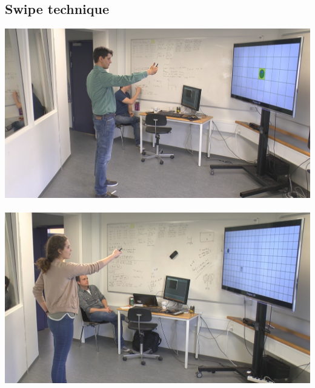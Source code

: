 \subsection*{Swipe technique}
\includegraphics[width=\textwidth]{docs/appendix/files/swipe_push.png}
\\\\
\includegraphics[width=\textwidth]{docs/appendix/files/swipe_pull.png}

